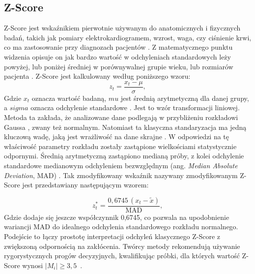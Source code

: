 \documentclass[a4paper,twoside,12pt]{book}
\newcommand{\obcy}[1]{\emph{#1}}
\newcommand{\english}[1]{{\selectlanguage{british}\obcy{#1}}}
\begin{document}
	\subsection{Z-Score}
	Z-Score jest wskaźnikiem pierwotnie używanym do anatomicznych i fizycznych badań, takich jak pomiary elektrokardiogramem, wzrost, waga, czy ciśnienie krwi, co ma zastosowanie przy diagnozach pacjentów \cite{curtis2016mystery}. Z matematycznego punktu widzenia opisuje on jak bardzo wartość w odchyleniach standardowych leży powyżej, lub poniżej średniej w porównywalnej grupie wieku, lub rozmiarów pacjenta \cite{curtis2016mystery}.
	Z-Score jest kalkulowany według poniższego wzoru:
	\begin{equation}
		z_t = \frac{x_t - \mu}{\sigma},
		\label{eq:zscore}
	\end{equation}
	Gdzie $x_t$ oznacza wartość badaną, $mu$ jest średnią arytmetyczną dla danej grupy, a $sigma$ oznacza odchylenie standardowe \cite{curtis2016mystery}. Jest to wzór transformacji liniowej. Metoda ta zakłada, że analizowane dane podlegają w przybliżeniu rozkładowi Gaussa \cite{aggarwal2016introduction}, zwany też normalnym. 
	Natomiast ta klasyczna standaryzacja ma jedną kluczową wadę, jaką jest wrażliwość na dane skrajne \cite{aggarwal2016introduction}. W odpowiedzi na tę właściwość parametry rozkładu zostały zastąpione wielkościami statystycznie odpornymi. Średnią arytmetyczną  zastąpiono medianą próby, z kolei odchylenie standardowe medianowym odchyleniem bezwzględnym (ang. \english{Median Absolute Deviation}, MAD) \cite{iglewicz1993volume}. Tak zmodyfikowany wskaźnik nazywany zmodyfikowanym Z-Score jest przedstawiany następującym wzorem:

	\begin{equation}
		z_t^* = \frac{0{,}6745\,(x_t - \tilde{x})}{\text{MAD}},
		\label{eq:zscore_mod}
	\end{equation}
	Gdzie dodaje się jeszcze współczynnik 0{,}6745, co pozwala na upodobnienie wariancji MAD do idealnego odchylenia standardowego rozkładu normalnego. Podejście to łączy prostotę interpretacji odchyleń klasycznego Z-Score z zwiększoną odpornością na zakłócenia. Twórcy metody rekomendują używanie rygorystycznych progów decyzyjnych, kwalifikując próbki, dla których wartość Z-Score  wynosi $|M_i| \ge 3{,}5$~\cite{iglewicz1993volume}. 
	
\end{document}
